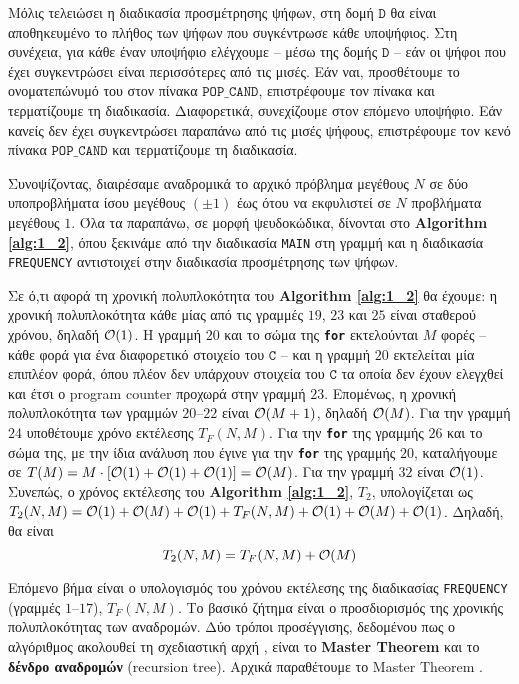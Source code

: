 	Μόλις τελειώσει η διαδικασία προσμέτρησης ψήφων, στη δομή $\mathtt{D}$ θα είναι αποθηκευμένο το πλήθος των ψήφων που συγκέντρωσε κάθε υποψήφιος. Στη συνέχεια, για κάθε έναν υποψήφιο ελέγχουμε -- μέσω της δομής $\mathtt{D}$ -- εάν οι ψήφοι που έχει συγκεντρώσει είναι περισσότερες από τις μισές. Εάν ναι, προσθέτουμε το ονοματεπώνυμό του στον πίνακα $\mathtt{POP\_CAND}$, επιστρέφουμε τον πίνακα και τερματίζουμε τη διαδικασία. Διαφορετικά, συνεχίζουμε στον επόμενο υποψήφιο. Εάν κανείς δεν έχει συγκεντρώσει παραπάνω από τις μισές ψήφους, επιστρέφουμε τον κενό πίνακα $\mathtt{POP\_CAND}$ και τερματίζουμε τη διαδικασία.\par
	\vspace*{10pt}
	Συνοψίζοντας, διαιρέσαμε αναδρομικά το αρχικό πρόβλημα μεγέθους $N$ σε δύο υποπροβλήματα ίσου μεγέθους $(\pm 1)$ έως ότου να εκφυλιστεί σε $N$ προβλήματα μεγέθους $1$. Όλα τα παραπάνω, σε μορφή ψευδοκώδικα, δίνονται στο \textbf{Algorithm \ref{alg:1_2}}, όπου ξεκινάμε από την διαδικασία \texttt{MAIN} στη γραμμή  και η διαδικασία \texttt{FREQUENCY} αντιστοιχεί στην διαδικασία προσμέτρησης των ψήφων.

	

	Σε ό,τι αφορά τη χρονική πολυπλοκότητα του \textbf{Algorithm \ref{alg:1_2}} θα έχουμε: η χρονική πολυπλοκότητα κάθε μίας από τις γραμμές ${19}$, ${23}$ και ${25}$ είναι σταθερού χρόνου, δηλαδή $\mathcal{O}(1)$. Η γραμμή ${20}$ και το σώμα της \texttt{\textbf{for}} εκτελούνται $M$ φορές -- κάθε φορά για ένα διαφορετικό στοιχείο του $\mathtt{C}$ -- και η γραμμή ${20}$ εκτελείται μία επιπλέον φορά, όπου πλέον δεν υπάρχουν στοιχεία του $\mathtt{C} $ τα οποία δεν έχουν ελεγχθεί και έτσι ο program counter προχωρά στην γραμμή ${23}$. Επομένως, η χρονική πολυπλοκότητα των γραμμών ${20}$--${22}$ είναι $\mathcal{O}(M+1)$, δηλαδή $\mathcal{O}(M)$. Για την γραμμή ${24}$ υποθέτουμε χρόνο εκτέλεσης $T_{F}(N,M)$. Για την \texttt{\textbf{for}} της γραμμής ${26}$ και το σώμα της, με την ίδια ανάλυση που έγινε για την \texttt{\textbf{for}} της γραμμής ${20}$, καταλήγουμε σε $T(M)=M\cdot\left[\mathcal{O}(1)+\mathcal{O}(1)+\mathcal{O}(1)\right]=\mathcal{O}(M)$. Για την γραμμή ${32}$ είναι $\mathcal{O}(1)$. Συνεπώς, ο χρόνος εκτέλεσης του \textbf{Algorithm \ref{alg:1_2}}, $T_2$, υπολογίζεται ως $T_{2}(N,M)=\mathcal{O}(1)+\mathcal{O}(M)+\mathcal{O}(1)+T_{F}(N,M)+\mathcal{O}(1)+\mathcal{O}(M)+\mathcal{O}(1)$. Δηλαδή, θα είναι
	\begin{equation}
		\label{eq:T_2}
		T_{2}(N,M)=T_{F}(N,M)+\mathcal{O}(M)
	\end{equation}

	Επόμενο βήμα είναι ο υπολογισμός του χρόνου εκτέλεσης της διαδικασίας \texttt{FREQUENCY} (γραμμές $1$--$17$), $T_{F}(N,M)$. Το βασικό ζήτημα είναι ο προσδιορισμός της χρονικής πολυπλοκότητας των αναδρομών. Δύο τρόποι προσέγγισης, δεδομένου πως ο αλγόριθμος ακολουθεί τη σχεδιαστική αρχή \dnc, είναι το \textbf{Master Theorem} και το \textbf{δένδρο αναδρομών} (recursion tree). Αρχικά παραθέτουμε το Master Theorem .

